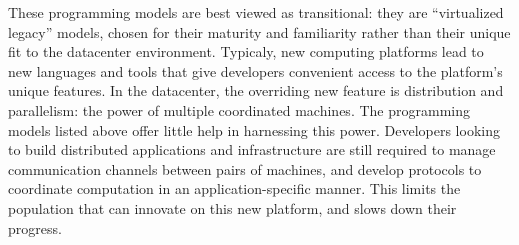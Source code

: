 \documentclass{sig-alternate}
\begin{document}
These programming models are best viewed as transitional: they are ``virtualized legacy'' models, chosen for their maturity and familiarity rather than their unique fit to the datacenter environment.  Typicaly, new computing platforms lead to new languages and tools that give developers convenient access to the platform's unique features.  In the datacenter, the overriding new feature is distribution and parallelism: the power of multiple coordinated machines.  The programming models listed above offer little help in harnessing this power.  Developers looking to build distributed applications and infrastructure are still required to manage communication channels between pairs of machines, and develop protocols to coordinate computation in an application-specific manner.  This limits the population that can innovate on this new platform, and slows down their progress.
\end{document}
